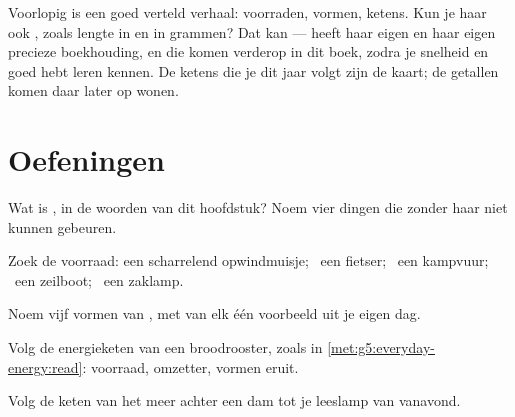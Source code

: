 \begin{remark}\label{rem:g5:everyday-energy:promise}
Voorlopig is  een goed verteld verhaal: voorraden, vormen,
ketens. Kun je haar ook \emph{}, zoals lengte in  en
 in grammen? Dat kan ---  heeft haar eigen
 en haar eigen precieze boekhouding, en die komen verderop in
dit boek, zodra je snelheid en  goed hebt leren kennen. De
ketens die je dit jaar volgt zijn de kaart; de getallen komen daar
later op wonen.
\end{remark}

\section{Oefeningen}

\begin{exercise}[$\star$]\label{exo:g5:everyday-energy:1}
Wat is , in de woorden van dit hoofdstuk? Noem vier dingen die
zonder haar niet kunnen gebeuren.
\end{exercise}

\begin{exercise}[$\star$]\label{exo:g5:everyday-energy:2}
Zoek de voorraad: een scharrelend opwindmuisje; \ een fietser; \ een
kampvuur; \ een zeilboot; \ een zaklamp.
\end{exercise}

\begin{exercise}[$\star$]\label{exo:g5:everyday-energy:3}
Noem vijf vormen van , met van elk één voorbeeld uit je eigen
dag.
\end{exercise}

\begin{exercise}[$\star$]\label{exo:g5:everyday-energy:4}
Volg de energieketen van een broodrooster, zoals in
\cref{met:g5:everyday-energy:read}: voorraad, omzetter, vormen eruit.
\end{exercise}

\begin{exercise}[$\star$]\label{exo:g5:everyday-energy:5}
Volg de keten van het meer achter een dam tot je leeslamp van
vanavond.
\end{exercise}

